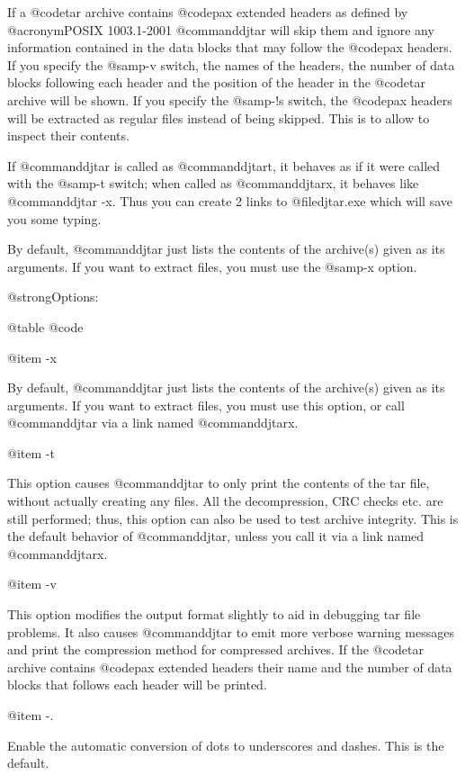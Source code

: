 If a @code{tar} archive contains @code{pax} extended headers as defined
by @acronym{POSIX} 1003.1-2001 @command{djtar} will skip them and ignore
any information contained in the data blocks that may follow the @code{pax}
headers.  If you specify the @samp{-v} switch, the names of the headers,
the number of data blocks following each header and the position of the
header in the @code{tar} archive will be shown.  If you specify the @samp{-!s}
switch, the @code{pax} headers will be extracted as regular files instead of
being skipped.  This is to allow to inspect their contents.  

If @command{djtar} is called as @command{djtart}, it behaves as if it were
called with the @samp{-t} switch; when called as @command{djtarx}, it
behaves like @command{djtar -x}.  Thus you can create 2 links to
@file{djtar.exe} which will save you some typing.

By default, @command{djtar} just lists the contents of the archive(s)
given as its arguments.  If you want to extract files, you must use
the @samp{-x} option.

@strong{Options:}

@table @code

@item -x

By default, @command{djtar} just lists the contents of the archive(s)
given as its arguments.  If you want to extract files, you must use
this option, or call @command{djtar} via a link named @command{djtarx}.

@item -t

This option causes @command{djtar} to only print the contents of the tar
file, without actually creating any files.  All the decompression, CRC
checks etc. are still performed; thus, this option can also be used to
test archive integrity.  This is the default behavior of
@command{djtar}, unless you call it via a link named @command{djtarx}.

@item -v

This option modifies the output format slightly to aid in debugging tar
file problems.  It also causes @command{djtar} to emit more verbose warning
messages and print the compression method for compressed archives.  If the
@code{tar} archive contains @code{pax} extended headers their name and the
number of data blocks that follows each header will be printed.
 
@item -.

Enable the automatic conversion of dots to underscores and dashes.  This
is the default.

